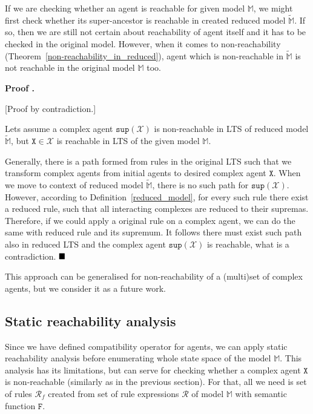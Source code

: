 \documentclass[12pt]{fithesis2}
\newcounter{counter}[section]
\renewcommand{\thecounter}{\thesection.\arabic{counter}}
\newenvironment{proof}{\bigskip\refstepcounter{counter}\noindent\textbf{Proof \thecounter}\par\nopagebreak}{\bigskip}
\newcommand*{\QEDA}{\hfill\ensuremath{\blacksquare}}%
\begin{document}
If we are checking whether an agent is reachable for given model $\mathds{M}$, we might first check whether its super-ancestor is reachable in created reduced model $\widetilde{\mathds{M}}$. If so, then we are still not certain about reachability of agent itself and it has to be checked in the original model. However, when it comes to non-reachability (Theorem~\ref{non-reachability_in_reduced}), agent which is non-reachable in $\widetilde{\mathds{M}}$ is not reachable in the original model $\mathds{M}$ too.

\begin{proof}

[Proof by contradiction.]

Lets assume a complex agent $\mathtt{sup}(\mathscr{X})$ is non-reachable in LTS of reduced model $\widetilde{\mathds{M}}$, but $\mathtt{X} \in \mathscr{X}$ is reachable in LTS of the given model $\mathds{M}$.

Generally, there is a path formed from rules in the original LTS such that we transform complex agents from initial agents to desired complex agent $\mathtt{X}$. When we move to context of reduced model $\widetilde{\mathds{M}}$, there is no such path for $\mathtt{sup}(\mathscr{X})$. However, according to Definition~\ref{reduced_model}, for every such rule there exist a reduced rule, such that all interacting complexes are reduced to their supremas. Therefore, if we could apply a original rule on a complex agent, we can do the same with reduced rule and its supremum. It follows there must exist such path also in reduced LTS and the complex agent $\mathtt{sup}(\mathscr{X})$ is reachable, what is a contradiction. $\QEDA$
\end{proof}

This approach can be generalised for non-reachability of a (multi)set of complex agents, but we consider it as a future work.

\subsection{Static reachability analysis}

Since we have defined compatibility operator for agents, we can apply static reachability analysis before enumerating whole state space of the model $\mathds{M}$. This analysis has its limitations, but can serve for checking whether a complex agent $\mathtt{X}$ is non-reachable (similarly as in the previous section). For that, all we need is set of rules $\mathcal{R}_f$ created from set of rule expressions $\mathcal{R}$ of model $\mathds{M}$ with semantic function $\mathtt{F}$.
\end{document}

